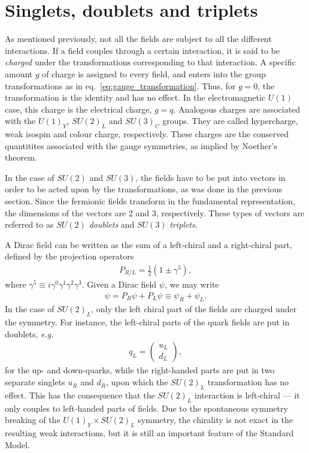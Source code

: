 \documentclass[twoside,english]{uiofysmaster}
\begin{document}
\section{Singlets, doublets and triplets}

As mentioned previously, not all the fields are subject to all the different interactions. If a field couples through a certain interaction, it is said to be {\it charged} under the transformations corresponding to that interaction. A specific amount $g$ of charge is assigned to every field, and enters into the group transformations as in eq.\ \eqref{eq:gauge_transformation}. Thus, for $g=0$, the transformation is the identity and has no effect. In the electromagnetic $U(1)$ case, this charge is the electrical charge, $g=q$. Analogous charges are associated with the $U(1)_Y$, $SU(2)_L$ and $SU(3)_C$ groups. They are called hypercharge, weak isospin and colour charge, respectively. These charges are the conserved quantitites associated with the gauge symmetries, as implied by Noether's theorem.

In the case of $SU(2)$ and $SU(3)$, the fields have to be put into vectors in order to be acted upon by the transformations, as was done in the previous section. Since the fermionic fields transform in the fundamental representation, the dimensions of the vectors are 2 and 3, respectively. These types of vectors are referred to as $SU(2)$ {\it doublets} and $SU(3)$ {\it triplets}.

A Dirac field can be written as the sum of a left-chiral and a right-chiral part, defined by the projection operators 
\begin{align}
	P_{R/L} = \frac{1}{2}\left( 1\pm \gamma^5 \right),
\end{align}
where $\gamma^5 \equiv i\gamma^0\gamma^1\gamma^2\gamma^3$. Given a Dirac field $\psi$, we may write
\begin{align}
	\psi = P_R \psi + P_L \psi \equiv \psi_R + \psi_L.
\end{align}
In the case of $SU(2)_L$, only the left chiral part of the fields are charged under the symmetry. For instance, the left-chiral parts of the quark fields are put in doublets, {\it e.g.}\
\begin{align}
	q_L = \begin{pmatrix}
		u_L \\ d_L
	\end{pmatrix},
\end{align}
for the up- and down-quarks, while the right-handed parts are put in two separate singlets $u_R$ and $d_R$, upon which the $SU(2)_L$ transformation has no effect. This has the consequence that the $SU(2)_L$ interaction is left-chiral --- it only couples to left-handed parts of fields. Due to the spontaneous symmetry breaking of the $U(1)_Y\times SU(2)_L$ symmetry, the chirality is not exact in the resulting weak interactions, but it is still an important feature of the Standard Model.
\end{document}
